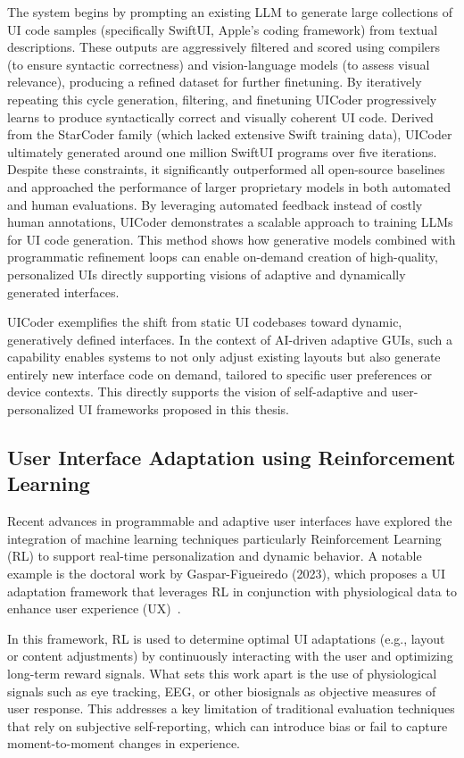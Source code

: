 \documentclass[openany]{book}
\begin{document}
The system begins by prompting an existing LLM to generate large collections of UI code samples (specifically SwiftUI, Apple's coding framework) from textual descriptions. These outputs are aggressively filtered and scored using compilers (to ensure syntactic correctness) and vision-language models (to assess visual relevance), producing a refined dataset for further finetuning. By iteratively repeating this cycle generation, filtering, and finetuning UICoder progressively learns to produce syntactically correct and visually coherent UI code.
Derived from the StarCoder family (which lacked extensive Swift training data), UICoder ultimately generated around one million SwiftUI programs over five iterations. Despite these constraints, it significantly outperformed all open-source baselines and approached the performance of larger proprietary models in both automated and human evaluations.
By leveraging automated feedback instead of costly human annotations, UICoder demonstrates a scalable approach to training LLMs for UI code generation. This method shows how generative models combined with programmatic refinement loops can enable on-demand creation of high-quality, personalized UIs directly supporting visions of adaptive and dynamically generated interfaces.

UICoder exemplifies the shift from static UI codebases toward dynamic, generatively defined interfaces. In the context of AI-driven adaptive GUIs, such a capability enables systems to not only adjust existing layouts but also generate entirely new interface code on demand, tailored to specific user preferences or device contexts. This directly supports the vision of self-adaptive and user-personalized UI frameworks proposed in this thesis.

\subsection{User Interface Adaptation using
Reinforcement Learning}
Recent advances in programmable and adaptive user interfaces have explored the integration of machine learning techniques particularly Reinforcement Learning (RL) to support real-time personalization and dynamic behavior. A notable example is the doctoral work by Gaspar-Figueiredo (2023), which proposes a UI adaptation framework that leverages RL in conjunction with physiological data to enhance user experience (UX)~\cite{gaspar2023learning}.

In this framework, RL is used to determine optimal UI adaptations (e.g., layout or content adjustments) by continuously interacting with the user and optimizing long-term reward signals. What sets this work apart is the use of physiological signals such as eye tracking, EEG, or other biosignals as objective measures of user response. This addresses a key limitation of traditional evaluation techniques that rely on subjective self-reporting, which can introduce bias or fail to capture moment-to-moment changes in experience.
\end{document}
